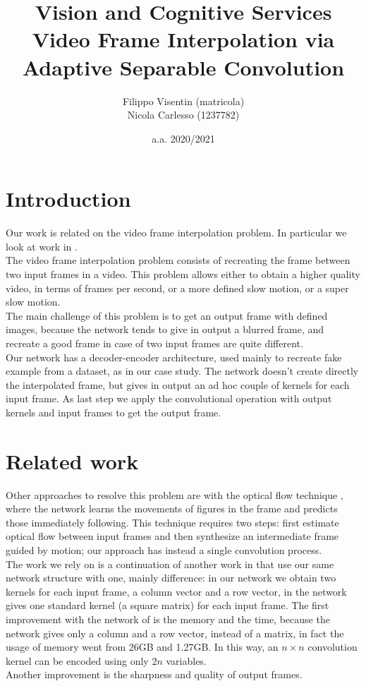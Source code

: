 \documentclass[11pt, a4paper]{article}
\title{Vision and Cognitive Services\\
\large Video Frame Interpolation via Adaptive Separable Convolution}
\author{Filippo Visentin (matricola)\\
Nicola Carlesso (1237782)}
\date{a.a. 2020/2021}
\begin{document}
	\maketitle
	\newpage
	
	\tableofcontents
	\newpage
	
	\section{Introduction}
	Our work is related on the video frame interpolation problem. In particular we look at work in \cite{mainpaper}.\\
	The video frame interpolation problem consists of recreating the frame between two input frames in a video. This problem allows either to obtain a higher quality video, in terms of frames per second, or a more defined slow motion, or a super slow motion.\\
	The main challenge of this problem is to get an output frame with defined images, because the network tends to give in output a blurred frame, and recreate a good frame in case of two input frames are quite different.\\
	Our network has a decoder-encoder architecture, used mainly to recreate fake example from a dataset, as in our case study. The network doesn't create directly the interpolated frame, but gives in output an ad hoc couple of kernels for each input frame. As last step we apply the convolutional operation with output kernels and input frames to get the output frame. 
	
	\section{Related work}
	Other approaches to resolve this problem are with the optical flow technique \cite{optical_flow}, where the network learns the movements of figures in the frame and predicts those immediately following. This technique requires two steps: first estimate optical flow between input frames and then synthesize an intermediate frame guided by motion; our approach has instead a single convolution process.\\
	The work we rely on is a continuation of another work in \cite{previous_work} that use our same network structure with one, mainly difference: in our network we obtain two kernels for each input frame, a column vector and a row vector, in \cite{optical_flow} the network gives one standard kernel (a square matrix) for each input frame. The first improvement with the network of \cite{mainpaper} is the memory and the time, because the network gives only a column and a row vector, instead of a matrix, in fact the usage of memory went from 26GB and 1.27GB.  In this way,	an $n\times n$ convolution kernel can be encoded using only $2n$ variables.\\
	Another improvement is the sharpness and quality of output frames.
	
\end{document}
